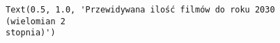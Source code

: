 \documentclass[11pt]{article}
\makeatletter
\newcommand{\boxspacing}{\kern\kvtcb@left@rule\kern\kvtcb@boxsep}
\newcommand{\prompt}[4]{
        {\ttfamily\llap{{\color{#2}[#3]:\hspace{3pt}#4}}\vspace{-\baselineskip}}
    }
\makeatother
\begin{document}
            \begin{tcolorbox}[breakable, size=fbox, boxrule=.5pt, pad at break*=1mm, opacityfill=0]
\prompt{Out}{outcolor}{76}{\boxspacing}
\begin{Verbatim}[commandchars=\\\{\}]
Text(0.5, 1.0, 'Przewidywana ilość filmów do roku 2030          (wielomian 2
stopnia)')
\end{Verbatim}
\end{tcolorbox}
        
    \begin{center}
    \end{center}
    { \hspace*{\fill} \\}
    
    \begin{center}
    \end{center}
    { \hspace*{\fill} \\}
    
\end{document}
